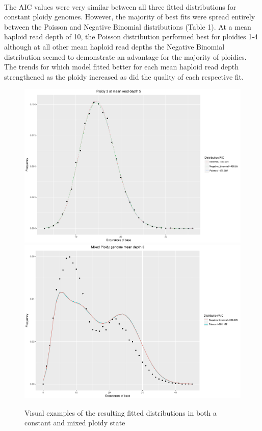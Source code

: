 \documentclass[11pt]{article}
\begin{document}
\paragraph{}The AIC values were very similar between all three fitted distributions for constant ploidy genomes. However, the majority of best fits were spread entirely between the Poisson and Negative Binomial distributions (Table 1). At a mean haploid read depth of 10, the Poisson distribution performed best for ploidies 1-4 although at all other mean haploid read depths the Negative Binomial distribution seemed to demonstrate an advantage for the majority of ploidies. The trends for which model fitted better for each mean haploid read depth strengthened as the ploidy increased as did the quality of each respective fit. 
\begin{figure}[H]
\begin{center}
\includegraphics[scale=0.5]{../Results/Example_Fit_Constant_Ploidy.pdf}
\includegraphics[scale=0.5]{../Results/Example_Fit_Mixed_Ploidy.pdf}
\caption{Visual examples of the resulting fitted distributions in both a constant and mixed ploidy state}
\end{center}

\end{figure}
\end{document}
